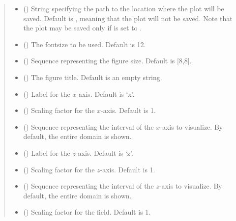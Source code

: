 \documentclass[letterpaper,10pt,english]{sphinxmanual}
\begin{document}
\begin{fulllineitems}
\begin{quote}
\begin{description}
\begin{itemize}
\item {} 
 () \textendash{} String specifying the path to the location where the plot will be saved. Default is ,
meaning that the plot will not be saved. Note that the plot may be saved only if  is
set to .

\item {} 
 () \textendash{} The fontsize to be used. Default is 12.

\item {} 
 () \textendash{} Sequence representing the figure size. Default is {[}8,8{]}.

\item {} 
 () \textendash{} The figure title. Default is an empty string.

\item {} 
 () \textendash{} Label for the \(x\)-axis. Default is ‘x’.

\item {} 
 () \textendash{} Scaling factor for the \(x\)-axis. Default is 1.

\item {} 
 () \textendash{} Sequence representing the interval of the \(x\)-axis to visualize.
By default, the entire domain is shown.

\item {} 
 () \textendash{} Label for the \(z\)-axis. Default is ‘z’.

\item {} 
 () \textendash{} Scaling factor for the \(z\)-axis. Default is 1.

\item {} 
 () \textendash{} Sequence representing the interval of the \(z\)-axis to visualize.
By default, the entire domain is shown.

\item {} 
 () \textendash{} Scaling factor for the field. Default is 1.


\end{itemize}
\end{description}
\end{quote}
\end{fulllineitems}
\end{document}
